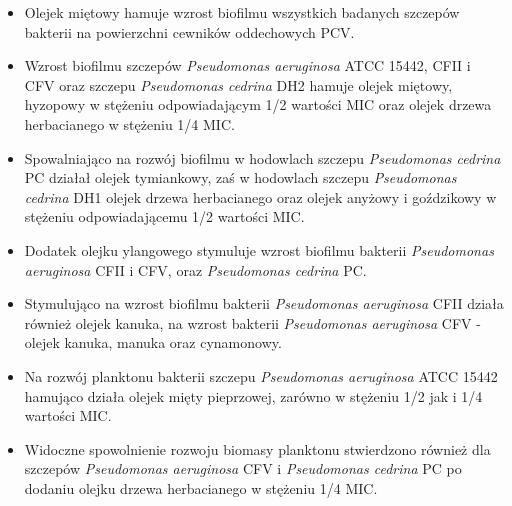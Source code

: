 \documentclass[11pt,a4paper]{report}
\begin{document}
\begin{itemize}
\item Olejek miętowy hamuje wzrost biofilmu wszystkich badanych szczepów bakterii na powierzchni cewników oddechowych PCV.

\item Wzrost biofilmu szczepów \textit{Pseudomonas aeruginosa} ATCC 15442, CFII i CFV oraz szczepu \textit{Pseudomonas cedrina} DH2 hamuje olejek miętowy, hyzopowy w stężeniu odpowiadającym 1/2 wartości MIC oraz olejek drzewa herbacianego w stężeniu 1/4 MIC.

\item Spowalniająco na rozwój biofilmu w hodowlach szczepu \textit{Pseudomonas cedrina} PC działał olejek tymiankowy, zaś w hodowlach szczepu \textit{Pseudomonas cedrina} DH1 olejek drzewa herbacianego oraz olejek anyżowy i goździkowy w stężeniu odpowiadającemu 1/2 wartości MIC.

\item Dodatek olejku ylangowego stymuluje wzrost biofilmu bakterii \textit{Pseudomonas aeruginosa} CFII i CFV, oraz \textit{Pseudomonas cedrina} PC.

\item Stymulująco na wzrost biofilmu bakterii \textit{Pseudomonas aeruginosa} CFII działa również olejek kanuka, na wzrost bakterii \textit{Pseudomonas aeruginosa} CFV - olejek kanuka, manuka oraz cynamonowy.

\item Na rozwój planktonu bakterii szczepu \textit{Pseudomonas aeruginosa} ATCC 15442 hamująco działa olejek mięty pieprzowej, zarówno w stężeniu 1/2 jak i 1/4 wartości MIC.

\item Widoczne spowolnienie rozwoju biomasy planktonu stwierdzono również dla szczepów  \textit{Pseudomonas aeruginosa} CFV i \textit{Pseudomonas cedrina} PC po dodaniu olejku drzewa herbacianego w stężeniu 1/4 MIC.

\end{itemize}


\clearpage




\listoffigures
\listoftables
\end{document}
